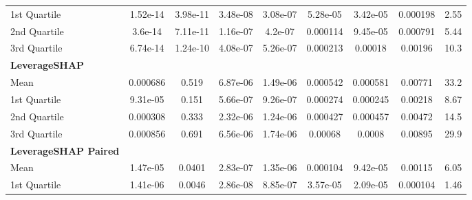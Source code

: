 {\begin{tabular} {lcccccccc}
\hspace{7pt}1st Quartile & \cellcolor{gold!60}1.52e-14 & \cellcolor{gold!60}3.98e-11 & 3.48e-08 & \cellcolor{gold!60}3.08e-07 & \cellcolor{bronze!60}5.28e-05 & 3.42e-05 & 0.000198 & \cellcolor{bronze!60}2.55 \\ 
\hspace{7pt}2nd Quartile & \cellcolor{gold!60}3.6e-14 & \cellcolor{gold!60}7.11e-11 & \cellcolor{silver!60}1.16e-07 & \cellcolor{silver!60}4.2e-07 & \cellcolor{bronze!60}0.000114 & \cellcolor{bronze!60}9.45e-05 & 0.000791 & \cellcolor{bronze!60}5.44 \\ 
\hspace{7pt}3rd Quartile & \cellcolor{gold!60}6.74e-14 & \cellcolor{silver!60}1.24e-10 & \cellcolor{bronze!60}4.08e-07 & \cellcolor{gold!60}5.26e-07 & \cellcolor{bronze!60}0.000213 & \cellcolor{bronze!60}0.00018 & \cellcolor{bronze!60}0.00196 & \cellcolor{bronze!60}10.3 \\ 
\addlinespace[1ex] 
\textbf{LeverageSHAP} &  &  &  &  &  &  &  &  \\ 
\hspace{7pt}Mean & 0.000686 & 0.519 & 6.87e-06 & 1.49e-06 & 0.000542 & 0.000581 & 0.00771 & 33.2 \\ 
\hspace{7pt}1st Quartile & 9.31e-05 & 0.151 & 5.66e-07 & 9.26e-07 & 0.000274 & 0.000245 & 0.00218 & 8.67 \\ 
\hspace{7pt}2nd Quartile & 0.000308 & 0.333 & 2.32e-06 & 1.24e-06 & 0.000427 & 0.000457 & 0.00472 & 14.5 \\ 
\hspace{7pt}3rd Quartile & 0.000856 & 0.691 & 6.56e-06 & 1.74e-06 & 0.00068 & 0.0008 & 0.00895 & 29.9 \\ 
\addlinespace[1ex] 
\textbf{LeverageSHAP Paired} &  &  &  &  &  &  &  &  \\ 
\hspace{7pt}Mean & \cellcolor{bronze!60}1.47e-05 & \cellcolor{bronze!60}0.0401 & \cellcolor{silver!60}2.83e-07 & \cellcolor{bronze!60}1.35e-06 & \cellcolor{silver!60}0.000104 & \cellcolor{silver!60}9.42e-05 & \cellcolor{gold!60}0.00115 & \cellcolor{gold!60}6.05 \\ 
\hspace{7pt}1st Quartile & \cellcolor{bronze!60}1.41e-06 & \cellcolor{bronze!60}0.0046 & \cellcolor{silver!60}2.86e-08 & \cellcolor{bronze!60}8.85e-07 & \cellcolor{silver!60}3.57e-05 & \cellcolor{silver!60}2.09e-05 & \cellcolor{gold!60}0.000104 & \cellcolor{gold!60}1.46 \\ 

\end{tabular}}
